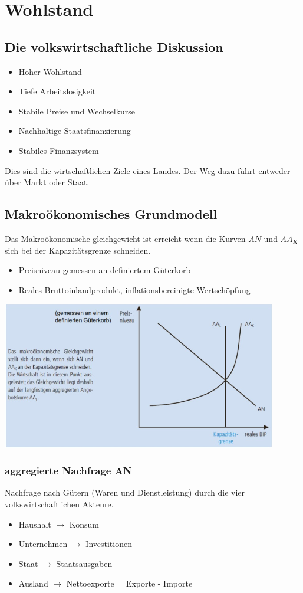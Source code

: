\section{Wohlstand}
\subsection{Die volkswirtschaftliche Diskussion}
\begin{itemize}
	\item Hoher Wohlstand
	\item Tiefe Arbeitslosigkeit
	\item Stabile Preise und Wechselkurse
	\item Nachhaltige Staatsfinanzierung
	\item Stabiles Finanzsystem
\end{itemize}
Dies sind die wirtschaftlichen Ziele eines Landes. Der Weg dazu führt entweder über Markt oder Staat.
\subsection{Makroökonomisches Grundmodell}
\begin{minipage}{7cm}
Das Makroökonomische gleichgewicht ist erreicht wenn die Kurven $AN$ und $AA_K$ sich bei der Kapazitätsgrenze schneiden. 
\begin{itemize}
	\item Preisniveau gemessen an definiertem Güterkorb
	\item Reales Bruttoinlandprodukt, inflationsbereinigte Wertschöpfung
\end{itemize}
\end{minipage}
\begin{minipage}{12cm}
		\includegraphics[width=12cm]{images/makro.jpg}
\end{minipage}


	\subsubsection{aggregierte Nachfrage AN}
	Nachfrage nach Gütern (Waren und Dienstleistung) durch die vier volkswirtschaftlichen Akteure.
	\begin{itemize}
		\item Haushalt $\rightarrow$ Konsum
		\item Unternehmen $\rightarrow$ Investitionen
		\item Staat $\rightarrow$ Staatsausgaben
		\item Ausland $\rightarrow$ Nettoexporte = Exporte - Importe
	\end{itemize}
